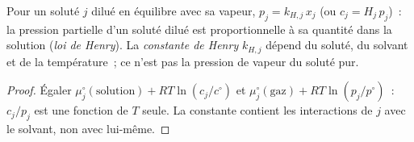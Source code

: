 \begin{proposition}\label{prop:b2:chemical-potential:henry}
Pour un soluté $j$ dilué en équilibre avec sa vapeur, $p_j = k_{H,j}\,x_j$
(ou $c_j = H_j\,p_j$)~: la pression partielle d'un soluté dilué est
proportionnelle à sa quantité dans la solution (\emph{loi de
Henry}). La \emph{constante de Henry}
$k_{H,j}$ dépend du soluté, du solvant et de la température~; ce n'est pas
la pression de vapeur du soluté pur.
\end{proposition}

\begin{proof}
Égaler $\mu_j^\circ(\text{solution}) + RT\ln(c_j/c^\circ)$ et
$\mu_j^\circ(\text{gaz}) + RT\ln(p_j/p^\circ)$~: $c_j/p_j$ est une fonction de $T$
seule. La constante contient les interactions de $j$ avec le solvant, non
avec lui-même.
\end{proof}

